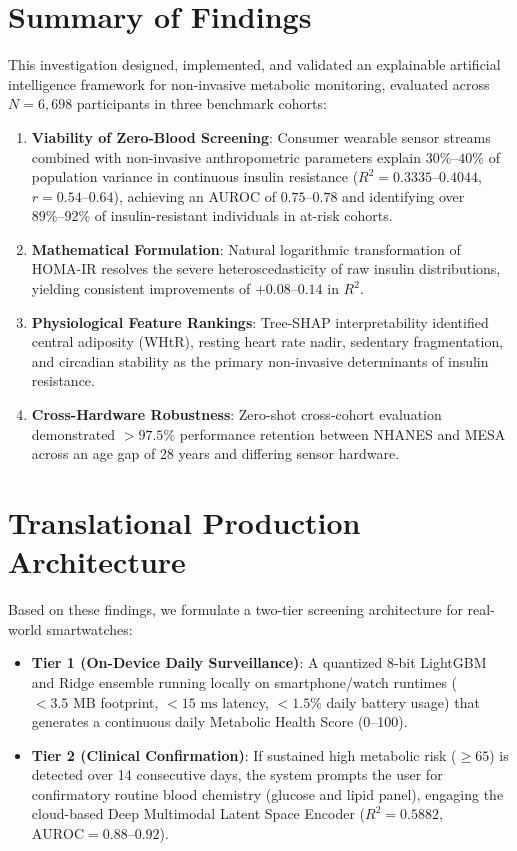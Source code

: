 \documentclass[12pt,a4paper,oneside]{report}
\begin{document}
\section{Summary of Findings}
This investigation designed, implemented, and validated an explainable artificial intelligence framework for non-invasive metabolic monitoring, evaluated across $N = 6,698$ participants in three benchmark cohorts:
\begin{enumerate}
    \item \textbf{Viability of Zero-Blood Screening}: Consumer wearable sensor streams combined with non-invasive anthropometric parameters explain $30\%\text{--}40\%$ of population variance in continuous insulin resistance ($R^2 = 0.3335\text{--}0.4044$, $r = 0.54\text{--}0.64$), achieving an AUROC of $0.75\text{--}0.78$ and identifying over $89\%\text{--}92\%$ of insulin-resistant individuals in at-risk cohorts.
    \item \textbf{Mathematical Formulation}: Natural logarithmic transformation of HOMA-IR resolves the severe heteroscedasticity of raw insulin distributions, yielding consistent improvements of $+0.08\text{--}0.14$ in $R^2$.
    \item \textbf{Physiological Feature Rankings}: Tree-SHAP interpretability identified central adiposity (WHtR), resting heart rate nadir, sedentary fragmentation, and circadian stability as the primary non-invasive determinants of insulin resistance.
    \item \textbf{Cross-Hardware Robustness}: Zero-shot cross-cohort evaluation demonstrated $> 97.5\%$ performance retention between NHANES and MESA across an age gap of 28 years and differing sensor hardware.
\end{enumerate}

\section{Translational Production Architecture}
Based on these findings, we formulate a two-tier screening architecture for real-world smartwatches:
\begin{itemize}
    \item \textbf{Tier 1 (On-Device Daily Surveillance)}: A quantized 8-bit LightGBM and Ridge ensemble running locally on smartphone/watch runtimes ($< 3.5\text{ MB}$ footprint, $< 15\text{ ms}$ latency, $< 1.5\%$ daily battery usage) that generates a continuous daily Metabolic Health Score (0--100).
    \item \textbf{Tier 2 (Clinical Confirmation)}: If sustained high metabolic risk ($\ge 65$) is detected over 14 consecutive days, the system prompts the user for confirmatory routine blood chemistry (glucose and lipid panel), engaging the cloud-based Deep Multimodal Latent Space Encoder ($R^2 = 0.5882$, $\text{AUROC} = 0.88\text{--}0.92$).
\end{itemize}
\end{document}

